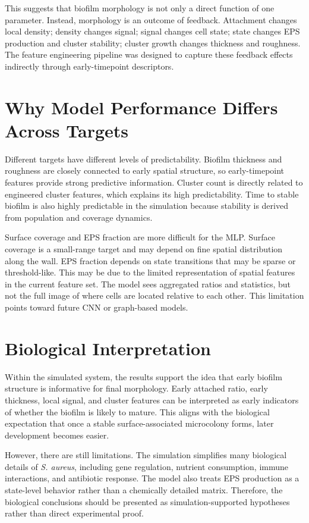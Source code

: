 \documentclass[12pt,a4paper,oneside]{report}
\begin{document}
This suggests that biofilm morphology is not only a direct function of one parameter. Instead, morphology is an outcome of feedback. Attachment changes local density; density changes signal; signal changes cell state; state changes EPS production and cluster stability; cluster growth changes thickness and roughness. The feature engineering pipeline was designed to capture these feedback effects indirectly through early-timepoint descriptors.

\section{Why Model Performance Differs Across Targets}
Different targets have different levels of predictability. Biofilm thickness and roughness are closely connected to early spatial structure, so early-timepoint features provide strong predictive information. Cluster count is directly related to engineered cluster features, which explains its high predictability. Time to stable biofilm is also highly predictable in the simulation because stability is derived from population and coverage dynamics.

Surface coverage and EPS fraction are more difficult for the MLP. Surface coverage is a small-range target and may depend on fine spatial distribution along the wall. EPS fraction depends on state transitions that may be sparse or threshold-like. This may be due to the limited representation of spatial features in the current feature set. The model sees aggregated ratios and statistics, but not the full image of where cells are located relative to each other. This limitation points toward future CNN or graph-based models.

\section{Biological Interpretation}
Within the simulated system, the results support the idea that early biofilm structure is informative for final morphology. Early attached ratio, early thickness, local signal, and cluster features can be interpreted as early indicators of whether the biofilm is likely to mature. This aligns with the biological expectation that once a stable surface-associated microcolony forms, later development becomes easier.

However, there are still limitations. The simulation simplifies many biological details of \textit{S. aureus}, including gene regulation, nutrient consumption, immune interactions, and antibiotic response. The model also treats EPS production as a state-level behavior rather than a chemically detailed matrix. Therefore, the biological conclusions should be presented as simulation-supported hypotheses rather than direct experimental proof.
\end{document}
